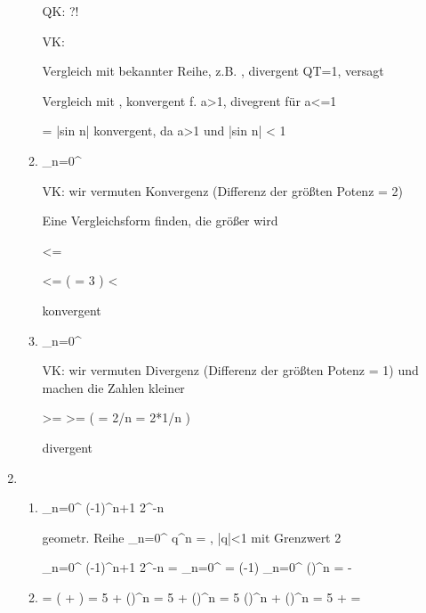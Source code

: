 \begin{enumerate}
\begin{enumerate}
QK:  ?!

VK:

Vergleich mit bekannter Reihe, z.B. , divergent \Rightarrow QT=1, versagt

Vergleich mit , konvergent f. a>1, divegrent für a<=1

\Rightarrow {} =  |sin n| konvergent, da a>1 und |sin n| < 1

\item \Sigma_{n=0}^{\infty} 

VK: wir vermuten Konvergenz (Differenz der größten Potenz = 2)

Eine Vergleichsform finden, die größer wird

 <= 

 <= (  = 3  ) < \infty

\Rightarrow konvergent

\item \Sigma_{n=0}^{\infty} 

VK: wir vermuten Divergenz (Differenz der größten Potenz = 1) und machen die Zahlen kleiner

 >=   >= (  = 2/n = 2*1/n \rightarrow \infty)

\Rightarrow divergent

\end{enumerate}

\item 

\begin{enumerate}

\item \Sima_{n=0}^{\infty} (-1)^{n+1} 2^{-n}

geometr. Reihe \Sigma_{n=0}^{\infty} q^n  = , |q|<1 mit Grenzwert 2

 \Sima_{n=0}^{\infty} (-1)^{n+1} 2^{-n}
 =  \Sima_{n=0}^{\infty} 
 =  (-1) \Sima_{n=0}^{\infty} ()^{n} = -
 
 \item {} 
 
=   ( + )
=  5   +   ()^n
=  5   +   ()^n
=  5  ()^n +   ()^n
=  5  +  = 


\end{enumerate}
\end{enumerate}
